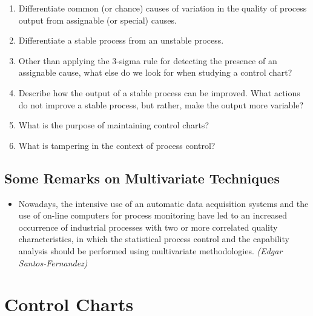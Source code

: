 \documentclass[]{report}
\begin{document}
\begin{enumerate}
\item  Differentiate common (or chance) causes of variation in the quality of process output from
assignable (or special) causes.
\item  Differentiate a stable process from an unstable process.
\item Other than applying the 3-sigma rule for detecting the presence of an assignable cause, what else do we look for when studying a control chart?
\item Describe how the output of a stable process can be improved. What actions do not improve a
stable process, but rather, make the output more variable?
\item  What is the purpose of maintaining control charts?
\item What is tampering in the context of process control?

\end{enumerate}




\section{Some Remarks on Multivariate Techniques}
{
	\large
	
	\begin{itemize}
		\item Nowadays, the intensive use of an automatic data acquisition systems and the use of
		on-line computers for process monitoring have led to an increased occurrence of
		industrial processes with two or more correlated quality characteristics, in which
		the statistical process control and the capability analysis should be performed using
		multivariate methodologies. \textit{(Edgar Santos-Fernandez)}
	\end{itemize}
}


\chapter{Control Charts}
\end{document}
